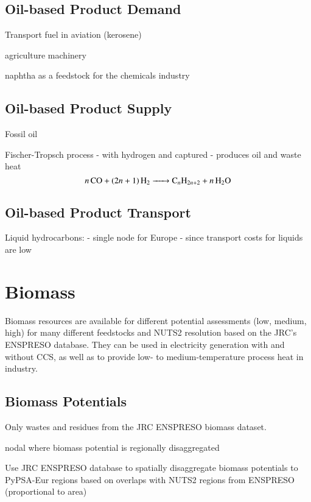 \subsection{Oil-based Product Demand}

Transport fuel in aviation (kerosene)

agriculture machinery

naphtha as a feedstock for the chemicals industry

\subsection{Oil-based Product Supply}

Fossil oil

Fischer-Tropsch process
- with hydrogen and captured \co{}
- produces oil and waste heat
\begin{equation}
    \ce{$n$CO + ($2n$ + 1)H2 -> C_$n$H_{2n+2} + $n$H2O}
\end{equation}


\subsection{Oil-based Product Transport}

Liquid hydrocarbons:
- single node for Europe
- since transport costs for liquids are low


\section{Biomass}

Biomass resources are available for different potential assessments (low,
medium, high) for many different feedstocks and NUTS2 resolution based on the
JRC’s ENSPRESO database. They can be used in electricity generation with and
without CCS, as well as to provide low- to medium-temperature process heat in
industry.

\subsection{Biomass Potentials}

Only wastes and residues from the JRC ENSPRESO biomass dataset.

nodal where biomass potential is regionally disaggregated 

Use JRC ENSPRESO database to spatially disaggregate biomass potentials to
PyPSA-Eur regions based on overlaps with NUTS2 regions from ENSPRESO
(proportional to area)

